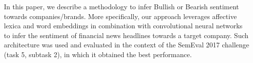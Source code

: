 In this paper, we describe a methodology to infer Bullish or Bearish sentiment towards companies/brands. More specifically, our approach leverages affective lexica and word embeddings in combination with convolutional neural networks to infer the sentiment of financial news headlines towards a target company. Such architecture was used and evaluated in the context of the SemEval 2017 challenge (task 5, subtask 2), in which it obtained the best performance.
